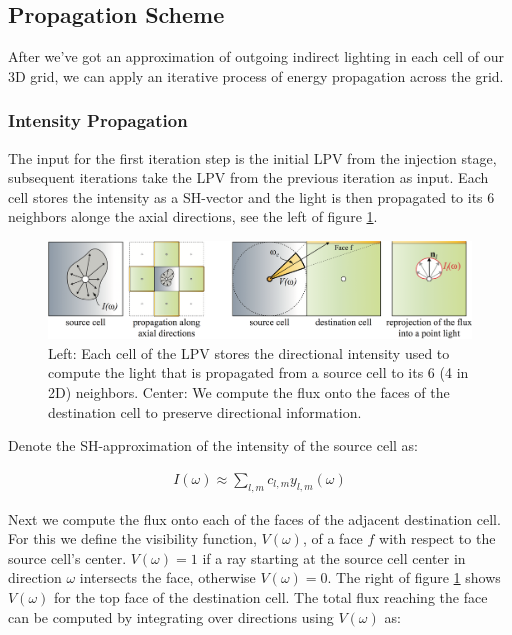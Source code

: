 \subsection{Propagation Scheme}
After we've got an approximation of outgoing indirect lighting in each cell of our 3D grid, we can apply an iterative process of energy propagation across the grid.



\subsubsection{Intensity Propagation}
The input for the first iteration step is the initial LPV from the injection stage, subsequent iterations take the LPV from the previous iteration as input. Each cell stores the intensity as a SH-vector and the light is then propagated to its 6 neighbors alonge the axial directions, see the left of figure \ref{f:lpv-propagation}.

\begin{figure}\label{f:lpv-propagation}
	\includegraphics{graphics/lpv/lpv-6-2}
	\caption{Left: Each cell of the LPV stores the directional intensity used to compute the light that is propagated from a source cell to its 6 (4 in 2D) neighbors. Center: We compute the flux onto the faces of the destination cell to preserve directional information.}
\end{figure}

Denote the SH-approximation of the intensity of the source cell as:

\begin{eqnarray*}
	I(\omega)\approx\sum_{l,m}c_{l,m}y_{l,m}(\omega)
\end{eqnarray*}

Next we compute the flux onto each of the faces of the adjacent destination cell. For this we define the visibility function, $V(\omega)$, of a face $f$ with respect to the source cell's center. $V(\omega)=1$ if a ray starting at the source cell center in direction $\omega$ intersects the face, otherwise $V(\omega)=0$. The right of figure \ref{f:lpv-propagation} shows $V(\omega)$ for the top face of the destination cell. The total flux reaching the face can be computed by integrating over directions using $V(\omega)$ as:

